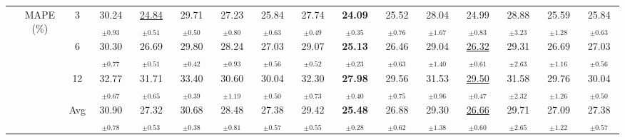 \begin{table}[t]
{\begin{tabular}{ccc|ccc|cccc|cccc|cc}
\cmidrule(lr){2-16}
 & \multirow{4}{*}{MAPE (\%)} & 3 & 30.24$_{\pm0.93}$ & \underline{24.84$_{\pm0.51}$} & 29.71$_{\pm0.50}$ & 27.23$_{\pm0.80}$ & 25.84$_{\pm0.63}$ & 27.74$_{\pm0.49}$ & \textbf{24.09$_{\pm0.35}$} & 25.52$_{\pm0.76}$ & 28.04$_{\pm1.67}$ & 24.99$_{\pm0.83}$ & 28.88$_{\pm3.23}$ & 25.59$_{\pm1.28}$ & 25.84$_{\pm0.63}$ \\
 &  & 6 & 30.30$_{\pm0.77}$ & 26.69$_{\pm0.51}$ & 29.80$_{\pm0.42}$ & 28.24$_{\pm0.93}$ & 27.03$_{\pm0.56}$ & 29.07$_{\pm0.52}$ & \textbf{25.13$_{\pm0.23}$} & 26.46$_{\pm0.63}$ & 29.04$_{\pm1.40}$ & \underline{26.32$_{\pm0.61}$} & 29.31$_{\pm2.63}$ & 26.69$_{\pm1.16}$ & 27.03$_{\pm0.56}$ \\
 &  & 12 & 32.77$_{\pm0.67}$ & 31.71$_{\pm0.65}$ & 33.40$_{\pm0.39}$ & 30.60$_{\pm1.19}$ & 30.04$_{\pm0.50}$ & 32.30$_{\pm0.73}$ & \textbf{27.98$_{\pm0.40}$} & 29.56$_{\pm0.75}$ & 31.53$_{\pm0.96}$ & \underline{29.50$_{\pm0.47}$} & 31.58$_{\pm2.32}$ & 29.76$_{\pm1.26}$ & 30.04$_{\pm0.50}$ \\
 &  & Avg & 30.90$_{\pm0.78}$ & 27.32$_{\pm0.53}$ & 30.68$_{\pm0.38}$ & 28.48$_{\pm0.81}$ & 27.38$_{\pm0.57}$ & 29.42$_{\pm0.55}$ & \textbf{25.48$_{\pm0.28}$} & 26.88$_{\pm0.62}$ & 29.30$_{\pm1.38}$ & \underline{26.66$_{\pm0.60}$} & 29.71$_{\pm2.65}$ & 27.09$_{\pm1.22}$ & 27.38$_{\pm0.57}$ \\
\bottomrule
\end{tabular}%
}
\end{table}
